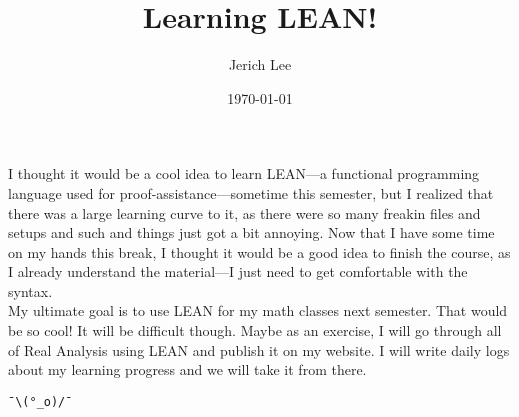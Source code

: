 \documentclass[12pt]{article}
\title{Learning LEAN!}
\author{Jerich Lee}
\date{\today}
\theoremstyle{definition} %
\theoremstyle{plain} %
\begin{document}
\maketitle
I thought it would be a cool idea to learn LEAN—a functional programming language used for proof-assistance—sometime this semester, but I realized that there was a large
learning curve to it, as there were so many freakin files and setups and such and things just got a bit annoying. Now that I have some time on my hands this break, I thought it would be a good idea to finish the course, as I already understand the material—I just need to get comfortable
with the syntax.
\\
My ultimate goal is to use LEAN for my math classes next semester. That would be so cool! It will be difficult though. Maybe as an exercise, I will go through all of Real Analysis using LEAN and publish it on my website. I will write daily logs about my learning progress and we will take it from there. \begin{verbatim}¯\(°_o)/¯\end{verbatim} 
\end{document}
